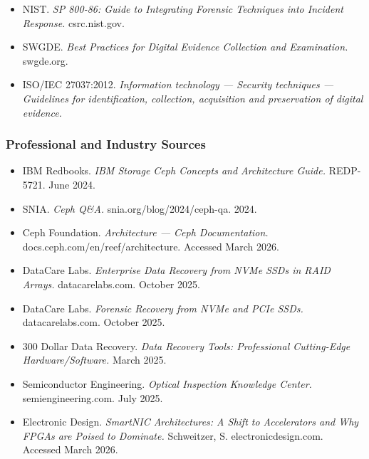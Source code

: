 \documentclass[11pt,letterpaper]{article}
\newcommand{\stageheader}[2]{%
  \noindent\colorbox{#2}{\makebox[\textwidth][l]{%
    \textcolor{white}{\bfseries\sffamily\hspace{6pt}#1\hspace{6pt}}}}%
  \vspace{0.5em}\par%
}
\begin{document}
\begin{itemize}[leftmargin=*]
  \item NIST. \textit{SP 800-86: Guide to Integrating Forensic Techniques into Incident Response.} csrc.nist.gov.
  \item SWGDE. \textit{Best Practices for Digital Evidence Collection and Examination.} swgde.org.
  \item ISO/IEC 27037:2012. \textit{Information technology --- Security techniques --- Guidelines for identification, collection, acquisition and preservation of digital evidence.}
\end{itemize}

\subsubsection{Professional and Industry Sources}

\begin{itemize}[leftmargin=*]
  \item IBM Redbooks. \textit{IBM Storage Ceph Concepts and Architecture Guide.} REDP-5721. June 2024.
  \item SNIA. \textit{Ceph Q\&A.} snia.org/blog/2024/ceph-qa. 2024.
  \item Ceph Foundation. \textit{Architecture --- Ceph Documentation.} docs.ceph.com/en/reef/architecture. Accessed March 2026.
  \item DataCare Labs. \textit{Enterprise Data Recovery from NVMe SSDs in RAID Arrays.} datacarelabs.com. October 2025.
  \item DataCare Labs. \textit{Forensic Recovery from NVMe and PCIe SSDs.} datacarelabs.com. October 2025.
  \item 300 Dollar Data Recovery. \textit{Data Recovery Tools: Professional Cutting-Edge Hardware/Software.} March 2025.
  \item Semiconductor Engineering. \textit{Optical Inspection Knowledge Center.} semiengineering.com. July 2025.
  \item Electronic Design. \textit{SmartNIC Architectures: A Shift to Accelerators and Why FPGAs are Poised to Dominate.} Schweitzer, S. electronicdesign.com. Accessed March 2026.
\end{itemize}


\newpage
\stageheader{STAGE 3 --- MISSION PACKAGE}{tertiary}
\end{document}

